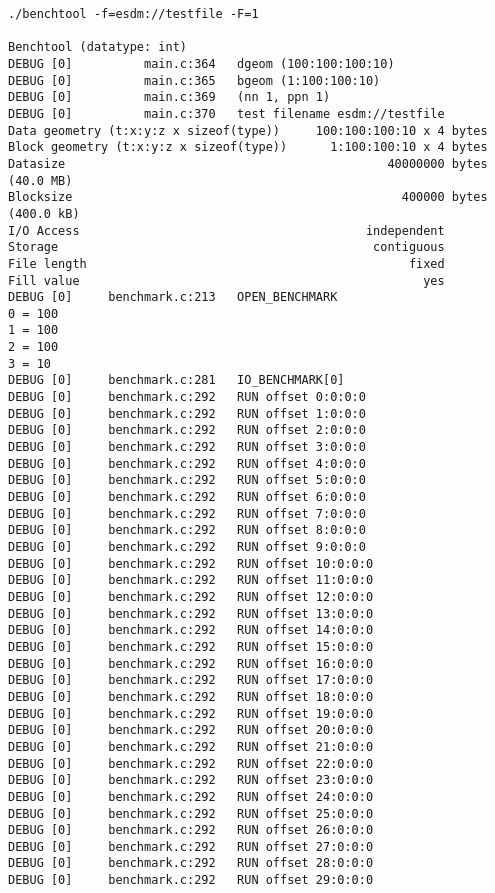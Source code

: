 \begin{verbatim}
./benchtool -f=esdm://testfile -F=1

Benchtool (datatype: int)
DEBUG [0]          main.c:364   dgeom (100:100:100:10)
DEBUG [0]          main.c:365   bgeom (1:100:100:10)
DEBUG [0]          main.c:369   (nn 1, ppn 1)
DEBUG [0]          main.c:370   test filename esdm://testfile
Data geometry (t:x:y:z x sizeof(type))     100:100:100:10 x 4 bytes
Block geometry (t:x:y:z x sizeof(type))      1:100:100:10 x 4 bytes
Datasize                                             40000000 bytes                (40.0 MB)
Blocksize                                              400000 bytes                (400.0 kB)
I/O Access                                        independent
Storage                                            contiguous
File length                                             fixed
Fill value                                                yes
DEBUG [0]     benchmark.c:213   OPEN_BENCHMARK
0 = 100
1 = 100
2 = 100
3 = 10
DEBUG [0]     benchmark.c:281   IO_BENCHMARK[0]
DEBUG [0]     benchmark.c:292   RUN offset 0:0:0:0
DEBUG [0]     benchmark.c:292   RUN offset 1:0:0:0
DEBUG [0]     benchmark.c:292   RUN offset 2:0:0:0
DEBUG [0]     benchmark.c:292   RUN offset 3:0:0:0
DEBUG [0]     benchmark.c:292   RUN offset 4:0:0:0
DEBUG [0]     benchmark.c:292   RUN offset 5:0:0:0
DEBUG [0]     benchmark.c:292   RUN offset 6:0:0:0
DEBUG [0]     benchmark.c:292   RUN offset 7:0:0:0
DEBUG [0]     benchmark.c:292   RUN offset 8:0:0:0
DEBUG [0]     benchmark.c:292   RUN offset 9:0:0:0
DEBUG [0]     benchmark.c:292   RUN offset 10:0:0:0
DEBUG [0]     benchmark.c:292   RUN offset 11:0:0:0
DEBUG [0]     benchmark.c:292   RUN offset 12:0:0:0
DEBUG [0]     benchmark.c:292   RUN offset 13:0:0:0
DEBUG [0]     benchmark.c:292   RUN offset 14:0:0:0
DEBUG [0]     benchmark.c:292   RUN offset 15:0:0:0
DEBUG [0]     benchmark.c:292   RUN offset 16:0:0:0
DEBUG [0]     benchmark.c:292   RUN offset 17:0:0:0
DEBUG [0]     benchmark.c:292   RUN offset 18:0:0:0
DEBUG [0]     benchmark.c:292   RUN offset 19:0:0:0
DEBUG [0]     benchmark.c:292   RUN offset 20:0:0:0
DEBUG [0]     benchmark.c:292   RUN offset 21:0:0:0
DEBUG [0]     benchmark.c:292   RUN offset 22:0:0:0
DEBUG [0]     benchmark.c:292   RUN offset 23:0:0:0
DEBUG [0]     benchmark.c:292   RUN offset 24:0:0:0
DEBUG [0]     benchmark.c:292   RUN offset 25:0:0:0
DEBUG [0]     benchmark.c:292   RUN offset 26:0:0:0
DEBUG [0]     benchmark.c:292   RUN offset 27:0:0:0
DEBUG [0]     benchmark.c:292   RUN offset 28:0:0:0
DEBUG [0]     benchmark.c:292   RUN offset 29:0:0:0

\end{verbatim}
